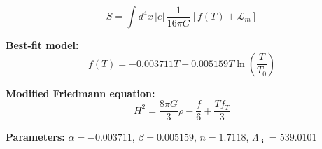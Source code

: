 
\begin{equation}
  S = \int d^4x \, |e| \, \frac{1}{16\pi G} \left[ f(T) + \mathcal{L}_m \right]
\end{equation}

\textbf{Best-fit model:}
\begin{equation}
  f(T) = -0.003711 T + 0.005159 T \ln\!\left(\frac{T}{T_0}\right)
\end{equation}

\textbf{Modified Friedmann equation:}
\begin{equation}
  H^2 = \frac{8\pi G}{3} \rho - \frac{f}{6} + \frac{T f_T}{3}
\end{equation}

\textbf{Parameters:}
$\alpha = -0.003711$, \quad
$\beta = 0.005159$, \quad
$n = 1.7118$, \quad
$\Lambda_{\text{BI}} = 539.0101$